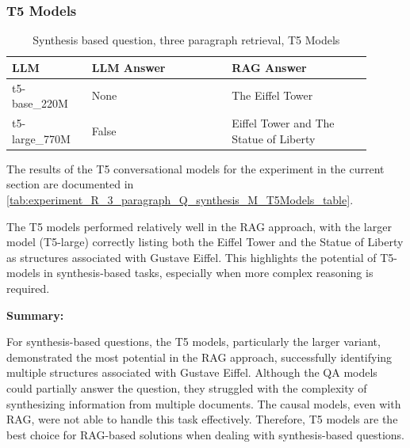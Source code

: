 \documentclass{wseas}
\begin{document}
\subsubsection{T5 Models}

\begin{table}[htbp]
  \centering
  \caption{Synthesis based question, three paragraph retrieval, T5 Models} %
  \label{tab:experiment_R_3_paragraph_Q_synthesis_M_T5Models_table}  %
  \begin{tabular}{|p{0.20\linewidth}|p{0.35\linewidth}|p{0.35\linewidth}|}
    \hline
    \textbf{LLM} & \textbf{LLM Answer} & \textbf{RAG Answer} \\
    \hline
    t5-base\_220M & None & The Eiffel Tower \\
    \hline
    t5-large\_770M & False & Eiffel Tower and The Statue of Liberty \\
    \hline
  \end{tabular}
\end{table}

The results of the T5 conversational models for the experiment in the current section
are documented in \autoref{tab:experiment_R_3_paragraph_Q_synthesis_M_T5Models_table}.

The T5 models performed relatively well in the RAG approach, with the larger 
model (T5-large) correctly listing both the Eiffel Tower and the Statue of Liberty
as structures associated with Gustave Eiffel. This highlights the potential of 
T5-models in synthesis-based tasks, especially when more complex reasoning is required.


\textbf{Summary:}

For synthesis-based questions, the T5 models, particularly the larger
variant, demonstrated the most potential in the RAG approach,
successfully identifying multiple structures associated with Gustave
Eiffel. Although the QA models could partially answer the question, they
struggled with the complexity of synthesizing information from multiple
documents. The causal models, even with RAG, were not able to handle
this task effectively. Therefore, T5 models are the best choice for
RAG-based solutions when dealing with synthesis-based questions.
\end{document}
